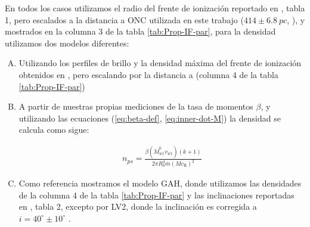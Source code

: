 En todos los casos utilizamos el radio del frente de ionización reportado en \citet{Garcia-Arredondo:2001}, tabla 1, pero escalados a la distancia a ONC utilizada en este trabajo ($414 \pm \SI{6.8}{pc}$, \citet{Menten:2007}), y mostrados en la columna 3 de la tabla \ref{tab:Prop-IF-par}, para la densidad utilizamos dos modelos diferentes:

\begin{enumerate}[A.]
\item Utilizando los perfiles de brillo y la densidad máxima del frente de ionización obtenidos en \citet{Garcia-Arredondo:2001}, pero escalando por la distancia a \thC{} (columna 4 de la tabla \ref{tab:Prop-IF-par})
\item A partir de nuestras propias mediciones de la tasa de momentos $\beta$, y utilizando las ecuaciones (\ref{eq:beta-def}, \ref{eq:inner-dot-M}) la densidad se calcula como sigue:

  \begin{align}
    n_{ps} = \frac{\beta\left(\dot{M}^0_{w1}v_{w1}\right)\left(k + 1\right)}{2\pi R^2_0 \bar{m}\left(M c_{\mathrm{II}}\right)^2} \label{eq:b-density}
  \end{align}
\item Como referencia mostramos el modelo GAH, donde utilizamos las densidades de la columna 4 de la tabla \ref{tab:Prop-IF-par} y las inclinaciones reportadas en \citet{HA:1998}, tabla 2, excepto por LV2, donde la inclinación es corregida a $i=40^\circ \pm 10^\circ$ \citep{Henney:2002, Garcia-Arredondo:2001}.
\end{enumerate}


